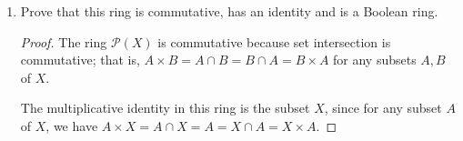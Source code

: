 \documentclass[11pt]{article}
\begin{document}
\begin{enumerate}
\begin{enumerate}[label=\textbf{(\alph*)}]
\begin{proof}
            The distributive laws hold: For any subsets $A,B,C$ of $X$, we have \begin{align*}
                (A+B)\times C &= [(A-B)\cup (B-A)]\times C\\
                &= (A\cap B^c \cap C)\cup (B\cap A^c\cap C)\\
                &= [(A\cap C \cap B^c)\cup (A\cap C \cap C^c)]\cup [(B\cap C\cap A^c)\cup (B\cap C\cap C^c)]\\
                &= [(A\cap C)\cap (B\cap C)^c] \cup [(B\cap C)\cap (A\cap C)^c]\\
                &= (A\cap C - B\cap C)\cup (B\cap C- A\cap C)\\
                &= (A\times C) + (B\times C)
            \end{align*} and \begin{align*}
                A\times (B + C) &= A\times [(B-C)\cup (C-B)]\\
                &= (A \cap B\cap C^c) \cup (A\cap C \cap B^c)\\
                &= [(A \cap B\cap C^c) \cup (A\cap B\cap A^c)]\cup [(A\cap C \cap B^c)\cup (A\cap C\cap A^c)]\\
                &= [(A\cap B)\cap(A\cap C)^c]\cup [(A\cap C)\cap(A\cap B)^c]\\
                &= (A\cap B - A\cap C) \cup (A\cap C - A\cap B)\\
                &= (A\times B)+ (A\times C).
            \end{align*}
            Hence $\mathcal{P}(X)$ is a ring under the operations of addition and multiplication given above.
        \end{proof}
        \item Prove that this ring is commutative, has an identity and is a Boolean ring.
        \begin{proof}
            The ring $\mathcal{P}(X)$ is commutative because set intersection is commutative; that is, $A\times B = A\cap B = B\cap A = B\times A$ for any subsets $A,B$ of $X$.

            The multiplicative identity in this ring is the subset $X$, since for any subset $A$ of $X$, we have $A\times X = A\cap X = A = X\cap A = X\times A$.


\end{proof}
\end{enumerate}
\end{enumerate}
\end{document}

